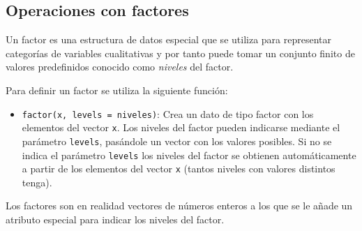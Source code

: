 \documentclass[
  a4paper,
]{scrreport}
\providecommand{\tightlist}{%
  \setlength{\itemsep}{0pt}\setlength{\parskip}{0pt}}\usepackage{longtable,booktabs,array}
\theoremstyle{definition}
\theoremstyle{definition}
\theoremstyle{remark}
\begin{document}
\hypertarget{operaciones-con-factores}{%
\subsection{Operaciones con factores}\label{operaciones-con-factores}}

Un factor es una estructura de datos especial que se utiliza para
representar categorías de variables cualitativas y por tanto puede tomar
un conjunto finito de valores predefinidos conocido como \emph{niveles}
del factor.

Para definir un factor se utiliza la siguiente función:

\begin{itemize}
\tightlist
\item
  \texttt{factor(x,\ levels\ =\ niveles)}: Crea un dato de tipo factor
  con los elementos del vector \texttt{x}. Los niveles del factor pueden
  indicarse mediante el parámetro \texttt{levels}, pasándole un vector
  con los valores posibles. Si no se indica el parámetro \texttt{levels}
  los niveles del factor se obtienen automáticamente a partir de los
  elementos del vector \texttt{x} (tantos niveles con valores distintos
  tenga).
\end{itemize}

Los factores son en realidad vectores de números enteros a los que se le
añade un atributo especial para indicar los niveles del factor.
\end{document}
